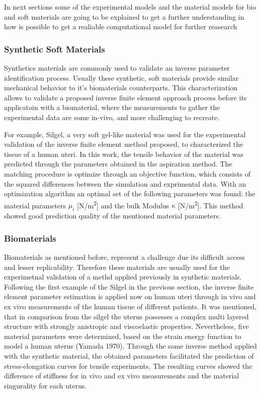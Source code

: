 In next sections some of the experimental models and the material models for bio and soft materials are 
going to be explained to get a further understanding in how is possible to get a realiable computational 
model for further reasearch

\subsubsection*{Synthetic Soft Materials}

Synthetics materials are commonly used to validate an inverse parameter identification process. 
Usually these synthetic, soft materials provide similar mechanical behavior to it's biomaterials 
counterparts. This characterization allows to validate a proposed inverse finite element approach process
before its applicatoin with a biomaterial, where the measurements to gather the experimental data are 
some in-vivo, and more challenging to recreate.


For example, Silgel, a very soft gel-like material \cite{Kauer2002} was used for the experimental 
validation of the inverse finite element method proposed, to characterized the tissue of 
a human uteri. In this work, the tensile behavior of the material was predicted through the 
parameters obtained in the aspiration method. The matching procedure is optimize through 
an objective function, which consists of the squared differences between the simulation 
and exprimental data. With an optimization algorithm an optimal set of the following parameters 
was found: the material parameters \(\mu_i\) [N/m\textsuperscript{2}] and the bulk Modulus
\(\kappa\) [N/m\textsuperscript{2}]. This method showed good prediction quality of the mentioned 
material parameters.

\subsubsection*{Biomaterials}
Biomaterials as mentioned before, represent a challenge due its difficult access and lesser replicability.
Therefore these materials are usually used for the experimetnal validation of a methd applied previously in 
synthetic materials. 
 Following the first example of the Silgel in the previous section, the inverse finite element parameter
 estimation is applied now on human uteri \cite{Kauer2002} through in vivo and ex vivo measurements of the human tissue of 
 different patients. It was mentioned, that in comparison from the silgel the uterus possesses a complex 
 multi layered structure with strongly anistropic and viscoelastic properties. Nevertheless, five 
 material parameters were determined, based on the strain energy function to model a human uterus (Yamada 1970).
Through the same inverse method applied with the synthetic material, the obtained parameters facilitated the prediction of stress-elongation curves for tensile experiments. The 
 resulting curves showed the difference of stiffness for in vivo and ex vivo measurements and the material 
 singurality for each uterus.


